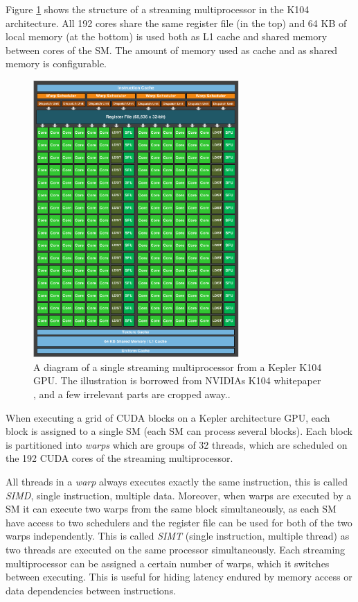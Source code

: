 Figure \ref{fig:kepler_sm} shows the structure of a streaming
multiprocessor in the K104 architecture. All 192 cores share the same
register file (in the top) and 64 KB of local memory (at the bottom)
is used both as L1 cache and shared memory between cores of the
SM. The amount of memory used as cache and as shared memory is
configurable.

\begin{figure}
  \centering
  \includegraphics[width=0.7\textwidth]{graphics/nvidia_kepler_k104_sm_cropped}
  \vspace{2mm}
  \caption{A diagram of a single streaming multiprocessor from a
    Kepler K104 GPU. The illustration is borrowed from NVIDIAs K104
    whitepaper \cite{nvidia2012geforcegtx680}, and a few irrelevant
    parts are cropped away..}
  \label{fig:kepler_sm}
\end{figure}

When executing a grid of CUDA blocks on a Kepler architecture GPU,
each block is assigned to a single SM (each SM can process several
blocks). Each block is partitioned into \textit{warps} which are
groups of 32 threads, which are scheduled on the 192 CUDA cores of the
streaming multiprocessor. 

All threads in a \textit{warp} always executes exactly the same
instruction, this is called \textit{SIMD}, single instruction,
multiple data. Moreover, when warps are executed by a SM it can
execute two warps from the same block simultaneously, as each SM have
access to two schedulers and the register file can be used for both of
the two warps independently. This is called \textit{SIMT} (single
instruction, multiple thread) as two threads are executed on the same
processor simultaneously. Each streaming multiprocessor can be
assigned a certain number of warps, which it switches between
executing. This is useful for hiding latency endured by memory access
or data dependencies between instructions.

